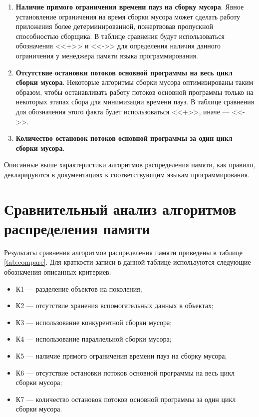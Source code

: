 \begin{enumerate}[label*=\arabic*.]
	\item \textbf{Наличие прямого ограничения времени пауз на сборку мусора}. \newline
	Явное установление ограничения на время сборки мусора может сделать работу приложения более детерминированной, пожертвовав пропускной способностью сборщика. В таблице сравнения будут использоваться обозначения <<+>> и <<->> для определения наличия данного ограничения у менеджера памяти языка программирования.
	
	\item \textbf{Отсутствие остановки потоков основной программы на весь цикл сборки мусора}. \newline
	Некоторые алгоритмы сборки мусора оптимизированы таким образом, чтобы останавливать работу потоков основной программы только на некоторых этапах сбора для минимизации времени пауз. В таблице сравнения для обозначения этого факта будет использоваться <<+>>, иначе --- <<->>.
	
	\item \textbf{Количество остановок потоков основной программы за один цикл сборки мусора}.
\end{enumerate}

Описанные выше характеристики алгоритмов распределения памяти, как правило, декларируются в документациях к соответствующим языкам программирования.



%
%
%
%
%
%
%
%
%
%
%



\section{Сравнительный анализ алгоритмов распределения памяти}

Результаты сравнения алгоритмов распределения памяти приведены в таблице \ref{tab:compare}. Для краткости записи в данной таблице используются следующие обозначения описанных критериев:

\begin{itemize}[label*=---]
	\item К1 --- разделение объектов на поколения;
	\item К2 --- отсутствие хранения вспомогательных данных в объектах;
	\item К3 --- использование конкурентной сборки мусора;
	\item К4 --- использование параллельной сборки мусора;
	\item К5 --- наличие прямого ограничения времени пауз на сборку мусора;
	\item К6 --- отсутствие остановки потоков основной программы на весь цикл сборки мусора;
	\item К7 --- количество остановок потоков основной программы за один цикл сборки мусора.
\end{itemize}

